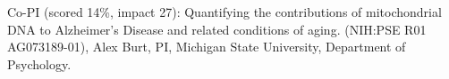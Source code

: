 

\item Co-PI (scored 14\%, impact 27): Quantifying the contributions of mitochondrial DNA to Alzheimer's Disease and related conditions of aging. (NIH:PSE R01 AG073189-01), Alex Burt, PI, Michigan State University, Department of Psychology.  %

